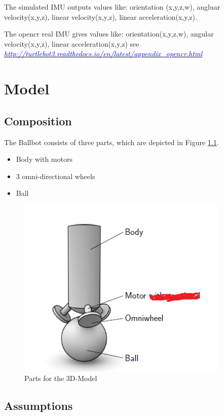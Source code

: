 \documentclass[twoside,colorback,accentcolor=tud4c,11pt]{tudreport}
\newcommand{\mylink}[2] {	\href{#1}{	\textit{\textcolor{blue}{#2}}}}
\begin{document}
	The simulated IMU outputs values like: orientation (x,y,z,w), angluar velocity(x,y,z), linear velocity(x,y,z), linear acceleration(x,y,z).
	
	The opencr real IMU gives values like: orientation(x,y,z,w), angular velocity(x,y,z), linear acceleration(x,y,z) see \mylink{OpenCR board IMU }{http://turtlebot3.readthedocs.io/en/latest/appendix\_opencr.html}
	
	\chapter{Model}
	
	\section{Composition}
	The Ballbot consists of three parts, which are depicted in Figure \ref{fig:Structure}.
	
	\begin{itemize}
		\item Body with motors
		\item 3 omni-directional wheels
		\item Ball
	\end{itemize}
	
	
	\begin{figure}[htbp]
		\centering
		\includegraphics[width=0.9\textwidth]{img/Strucuture.PNG}
		\caption{Parts for the 3D-Model}
		\label{fig:Structure}
	\end{figure}
	
	\section{Assumptions}
	
\end{document}
